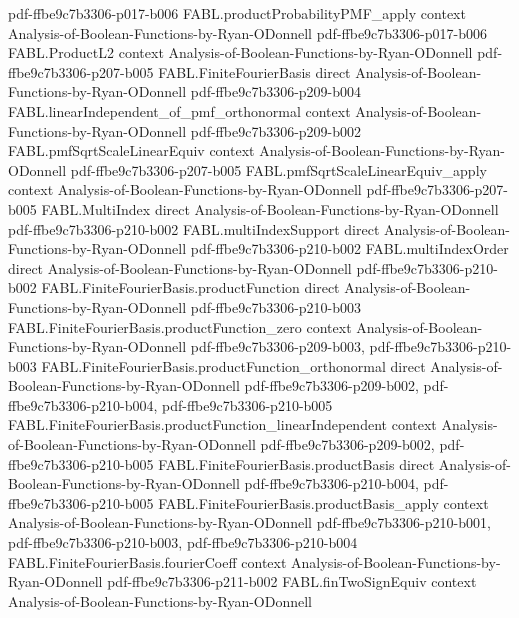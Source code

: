 \begin{theorem}
  {pdf-ffbe9c7b3306-p017-b006}
\proofstep
  {FABL.productProbabilityPMF_apply}
  {context}
  {Analysis-of-Boolean-Functions-by-Ryan-ODonnell}
  {pdf-ffbe9c7b3306-p017-b006}
\proofstep
  {FABL.ProductL2}
  {context}
  {Analysis-of-Boolean-Functions-by-Ryan-ODonnell}
  {pdf-ffbe9c7b3306-p207-b005}
\proofstep
  {FABL.FiniteFourierBasis}
  {direct}
  {Analysis-of-Boolean-Functions-by-Ryan-ODonnell}
  {pdf-ffbe9c7b3306-p209-b004}
\proofstep
  {FABL.linearIndependent_of_pmf_orthonormal}
  {context}
  {Analysis-of-Boolean-Functions-by-Ryan-ODonnell}
  {pdf-ffbe9c7b3306-p209-b002}
\proofstep
  {FABL.pmfSqrtScaleLinearEquiv}
  {context}
  {Analysis-of-Boolean-Functions-by-Ryan-ODonnell}
  {pdf-ffbe9c7b3306-p207-b005}
\proofstep
  {FABL.pmfSqrtScaleLinearEquiv_apply}
  {context}
  {Analysis-of-Boolean-Functions-by-Ryan-ODonnell}
  {pdf-ffbe9c7b3306-p207-b005}
\proofstep
  {FABL.MultiIndex}
  {direct}
  {Analysis-of-Boolean-Functions-by-Ryan-ODonnell}
  {pdf-ffbe9c7b3306-p210-b002}
\proofstep
  {FABL.multiIndexSupport}
  {direct}
  {Analysis-of-Boolean-Functions-by-Ryan-ODonnell}
  {pdf-ffbe9c7b3306-p210-b002}
\proofstep
  {FABL.multiIndexOrder}
  {direct}
  {Analysis-of-Boolean-Functions-by-Ryan-ODonnell}
  {pdf-ffbe9c7b3306-p210-b002}
\proofstep
  {FABL.FiniteFourierBasis.productFunction}
  {direct}
  {Analysis-of-Boolean-Functions-by-Ryan-ODonnell}
  {pdf-ffbe9c7b3306-p210-b003}
\proofstep
  {FABL.FiniteFourierBasis.productFunction_zero}
  {context}
  {Analysis-of-Boolean-Functions-by-Ryan-ODonnell}
  {pdf-ffbe9c7b3306-p209-b003,
    pdf-ffbe9c7b3306-p210-b003}
\proofstep
  {FABL.FiniteFourierBasis.productFunction_orthonormal}
  {direct}
  {Analysis-of-Boolean-Functions-by-Ryan-ODonnell}
  {pdf-ffbe9c7b3306-p209-b002,
    pdf-ffbe9c7b3306-p210-b004,
    pdf-ffbe9c7b3306-p210-b005}
\proofstep
  {FABL.FiniteFourierBasis.productFunction_linearIndependent}
  {context}
  {Analysis-of-Boolean-Functions-by-Ryan-ODonnell}
  {pdf-ffbe9c7b3306-p209-b002,
    pdf-ffbe9c7b3306-p210-b005}
\proofstep
  {FABL.FiniteFourierBasis.productBasis}
  {direct}
  {Analysis-of-Boolean-Functions-by-Ryan-ODonnell}
  {pdf-ffbe9c7b3306-p210-b004,
    pdf-ffbe9c7b3306-p210-b005}
\proofstep
  {FABL.FiniteFourierBasis.productBasis_apply}
  {context}
  {Analysis-of-Boolean-Functions-by-Ryan-ODonnell}
  {pdf-ffbe9c7b3306-p210-b001,
    pdf-ffbe9c7b3306-p210-b003,
    pdf-ffbe9c7b3306-p210-b004}
\proofstep
  {FABL.FiniteFourierBasis.fourierCoeff}
  {context}
  {Analysis-of-Boolean-Functions-by-Ryan-ODonnell}
  {pdf-ffbe9c7b3306-p211-b002}
\proofstep
  {FABL.finTwoSignEquiv}
  {context}
  {Analysis-of-Boolean-Functions-by-Ryan-ODonnell}

\end{theorem}
